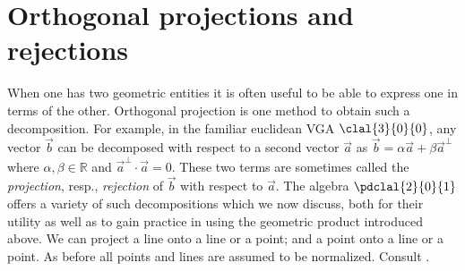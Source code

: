 \documentclass{birkjour}
\newcommand{\fvsh}[2]{\ifthenelse{\equal{\isFV}{true}}{#1}{#2}}
\newcommand{\mydisp}[2]{\ifthenelse{\equal{\isFV}{true}}{\[ #1\]}{$ #1 $#2}}
\begin{document}
%
% 
 


\section{Orthogonal projections and rejections}
\label{sec:orthpro}
When one has two geometric entities it is often useful to be able to express one in terms of the other. Orthogonal projection is one method to obtain such a decomposition. %
For example, in the familiar euclidean VGA $\clal{3}{0}{0}$, any vector $\vec{b}$ can be decomposed with respect to a second vector $\vec{a}$ as $\vec{b} = \alpha \vec{a} + \beta \vec{a}^\perp$ where $\alpha, \beta \in \mathbb{R}$ and $\vec{a}^\perp \cdot \vec{a} = 0$. These two terms are sometimes called the \emph{projection}, resp., \emph{rejection} of $\vec{b}$ with respect to $\vec{a}$.
The algebra $\pdclal{2}{0}{1}$ offers a variety of such decompositions which we now discuss, both for their utility as well as to gain practice in using the geometric product introduced above.  We can project a line onto a line or a point; and a point onto a line or a point.  As before all points and lines are assumed to be normalized.    Consult . 
\end{document}
